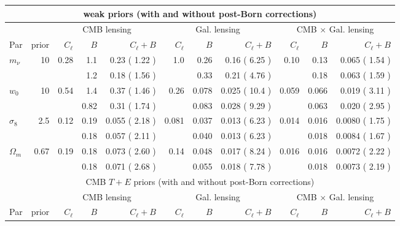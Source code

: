 \documentclass[11pt]{article} %
\newcommand{\greenfactor}[1]{%
    \pgfmathsetmacro{\value}{min(100,round(100*(#1-1)))}%
    \textcolor{green!80!black!\value!black}{#1}%
}
\begin{document}
\begin{table}
    \centering
    \scriptsize
 \begin{tabular}{|l|r|rrr|rrr|rrr|}
        \hline
        \multicolumn{11}{|c|}{weak priors (with and without post-Born corrections)} \\
        \hline
        && \multicolumn{3}{c|}{CMB lensing} & \multicolumn{3}{c|}{Gal. lensing} & \multicolumn{3}{c|}{CMB $\times$ Gal. lensing} \\
        \hline
        Par & prior & $C_\ell$ & $B$ & $C_\ell + B$ & $C_\ell$ & $B$ & $C_\ell + B$ & $C_\ell$ & $B$ & $C_\ell + B$ \\
        \hline
$m_\nu$    & 10 & 0.28 & 1.1 & 0.23 (\greenfactor{1.22}) & 1.0 & 0.26 & 0.16 (\greenfactor{6.25}) & 0.10 & 0.13 & 0.065 (\greenfactor{1.54}) \\
\rowcolor{blue!10}
           &    &  & 1.2 & 0.18 (\greenfactor{1.56}) & & 0.33 & 0.21 (\greenfactor{4.76}) & & 0.18 & 0.063 (\greenfactor{1.59}) \\
$w_0$      & 10 & 0.54 & 1.4 & 0.37 (\greenfactor{1.46}) & 0.26 & 0.078 & 0.025 (\greenfactor{10.4}) & 0.059 & 0.066 & 0.019 (\greenfactor{3.11}) \\
\rowcolor{blue!10}
           &    &  & 0.82 & 0.31 (\greenfactor{1.74}) &  & 0.083 & 0.028 (\greenfactor{9.29}) & & 0.063 & 0.020 (\greenfactor{2.95}) \\
$\sigma_8$ & 2.5 & 0.12 & 0.19 & 0.055 (\greenfactor{2.18}) & 0.081 & 0.037 & 0.013 (\greenfactor{6.23}) & 0.014 & 0.016 & 0.0080 (\greenfactor{1.75}) \\
\rowcolor{blue!10}
           &     &  & 0.18 & 0.057 (\greenfactor{2.11}) & & 0.040 & 0.013 (\greenfactor{6.23}) & & 0.018 & 0.0084 (\greenfactor{1.67}) \\
$\Omega_m$ & 0.67 & 0.19 & 0.18 & 0.073 (\greenfactor{2.60}) & 0.14 & 0.048 & 0.017 (\greenfactor{8.24}) & 0.016 & 0.016 & 0.0072 (\greenfactor{2.22}) \\
\rowcolor{blue!10}
           &     &  & 0.18 & 0.071 (\greenfactor{2.68}) & & 0.055 & 0.018 (\greenfactor{7.78}) & & 0.018 & 0.0073 (\greenfactor{2.19}) \\
        \hline
        \multicolumn{11}{|c|}{CMB $T + E$ priors (with and without post-Born corrections)} \\
        \hline
        && \multicolumn{3}{c|}{CMB lensing} & \multicolumn{3}{c|}{Gal. lensing} & \multicolumn{3}{c|}{CMB $\times$ Gal. lensing} \\
        \hline
        Par & prior & $C_\ell$ & $B$ & $C_\ell + B$ & $C_\ell$ & $B$ & $C_\ell + B$ & $C_\ell$ & $B$ & $C_\ell + B$ \\

\end{tabular}
\end{table}
\end{document}
